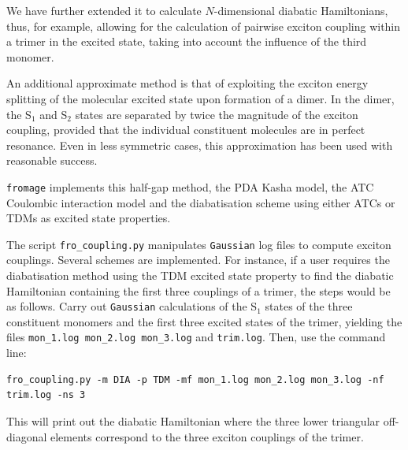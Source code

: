 We have further extended it to calculate $N$-dimensional diabatic Hamiltonians, thus, for example, allowing for the calculation of pairwise exciton coupling within a trimer in the excited state, taking into account the influence of the third monomer.

An additional approximate method is that of exploiting the exciton energy splitting of the molecular excited state upon formation of a dimer. In the dimer, the S$_1$ and S$_2$ states are separated by twice the magnitude of the exciton coupling, provided that the individual constituent molecules are in perfect resonance.\cite{Hsu2009} Even in less symmetric cases, this approximation has been used with reasonable success.\cite{Gierschner2013,Shi2017,Dommett2019}

\texttt{fromage} implements this half-gap method, the PDA Kasha model, the ATC Coulombic interaction model and the diabatisation scheme using either ATCs or TDMs as excited state properties.

The script \texttt{fro\_coupling.py} manipulates \texttt{Gaussian} log files to compute exciton couplings. Several schemes are implemented. For instance, if a user requires the diabatisation method using the TDM excited state property to find the diabatic Hamiltonian containing the first three couplings of a trimer, the steps would be as follows. Carry out \texttt{Gaussian} calculations of the S$_1$ states of the three constituent monomers and the first three excited states of the trimer, yielding the files \texttt{mon\_1.log mon\_2.log mon\_3.log} and \texttt{trim.log}. Then, use the command line:
\begin{verbatim}
fro_coupling.py -m DIA -p TDM -mf mon_1.log mon_2.log mon_3.log -nf trim.log -ns 3
\end{verbatim}

This will print out the diabatic Hamiltonian where the three lower triangular off-diagonal elements correspond to the three exciton couplings of the trimer.

